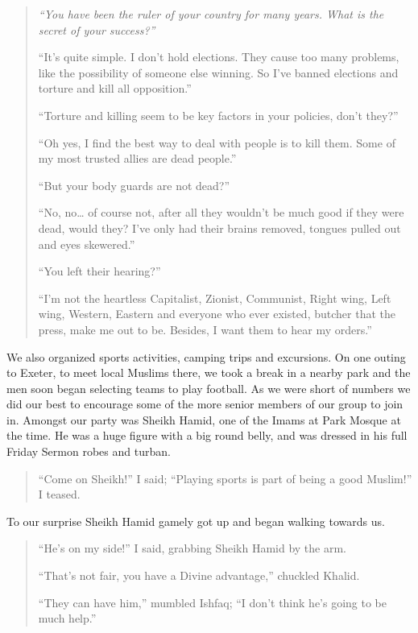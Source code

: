 \documentclass[12pt]{memoir}
\begin{document}
\begin{quote}
\itshape
“You have been the ruler of your country for many years.
What is the secret of your success?”

“It’s quite simple.
I don’t hold elections.
They cause too many problems, like the possibility of someone else winning.
So I’ve banned elections and torture and kill all opposition.”

“Torture and killing seem to be key factors in your policies, don’t they?”

“Oh yes, I find the best way to deal with people is to kill them.
Some of my most trusted allies are dead people.”

“But your body guards are not dead?”

“No, no… of course not,
after all they wouldn’t be much good if they were dead, would they?
I’ve only had their brains removed, tongues pulled out and eyes skewered.”

“You left their hearing?”

“I’m not the heartless Capitalist, Zionist, Communist, Right wing,
Left wing, Western, Eastern and everyone who ever existed,
butcher that the press, make me out to be.
Besides, I want them to hear my orders.”
\end{quote}

We also organized sports activities, camping trips and excursions.
On one outing to Exeter, to meet local Muslims there,
we took a break in a nearby park
and the men soon began selecting teams to play football.
As we were short of numbers we did our best to encourage
some of the more senior members of our group to join in.
Amongst our party was Sheikh Hamid,
one of the Imams at  Park Mosque at the time.
He was a huge figure with a big round belly,
and was dressed in his full Friday Sermon robes and turban.

\begin{quote}
“Come on Sheikh!” I said;
“Playing sports is part of being a good Muslim!” I teased.
\end{quote}

To our surprise Sheikh Hamid gamely got up and began walking towards us.

\begin{quote}
“He’s on my side!”
I said, grabbing Sheikh Hamid by the arm.

“That’s not fair, you have a Divine advantage,” chuckled Khalid.

“They can have him,” mumbled Ishfaq;
“I don’t think he’s going to be much help.”
\end{quote}
\end{document}
